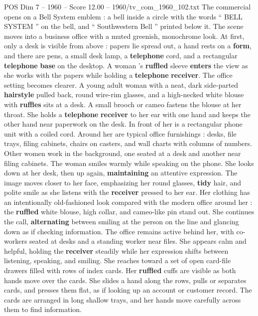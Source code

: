 \begin{textsample}{POS Dim 7 – 1960 – Score 12.00 – 1960/tv\_com\_1960\_102.txt}  \label{ex:f7_pos_029}
The commercial opens on a Bell System emblem : a bell inside a circle with the words “ BELL SYSTEM ” on the bell, and “ Southwestern Bell ” printed below it.
The scene moves into a business office with a muted greenish, monochrome look.
At first, only a desk is visible from above : papers lie spread out, a hand rests on a \textbf{form}, and there are pens, a small desk lamp, a \textbf{telephone} cord, and a rectangular \textbf{telephone} \textbf{base} on the desktop.
A woman ’s \textbf{ruffled} sleeve \textbf{enters} the view as she works with the papers while holding a \textbf{telephone} \textbf{receiver}.
The office setting becomes clearer.
A young adult woman with a neat, dark side-parted \textbf{hairstyle} pulled back, round wire-rim glasses, and a high-necked white blouse with \textbf{ruffles} sits at a desk.
A small brooch or cameo fastens the blouse at her throat.
She holds a \textbf{telephone} \textbf{receiver} to her ear with one hand and keeps the other hand near paperwork on the desk.
In front of her is a rectangular phone unit with a coiled cord.
Around her are typical office furnishings : desks, file trays, filing cabinets, chairs on casters, and wall charts with columns of numbers.
Other women work in the background, one seated at a desk and another near filing cabinets.
The woman smiles warmly while speaking on the phone.
She looks down at her desk, then up again, \textbf{maintaining} an attentive expression.
The image moves closer to her face, emphasizing her round glasses, \textbf{tidy} hair, and polite smile as she listens with the \textbf{receiver} pressed to her ear.
Her clothing has an intentionally old-fashioned look compared with the modern office around her : the \textbf{ruffled} white blouse, high collar, and cameo-like pin stand out.
She continues the call, \textbf{alternating} between smiling at the person on the line and glancing down as if checking information.
The office remains active behind her, with co-workers seated at desks and a standing worker near files.
She appears calm and helpful, holding the \textbf{receiver} steadily while her expression shifts between listening, speaking, and smiling.
She reaches toward a set of open card-file drawers filled with rows of index cards.
Her \textbf{ruffled} cuffs are visible as both hands move over the cards.
She slides a hand along the rows, pulls or separates cards, and presses them flat, as if looking up an account or customer record.
The cards are arranged in long shallow trays, and her hands move carefully across them to find information.

\end{textsample}
